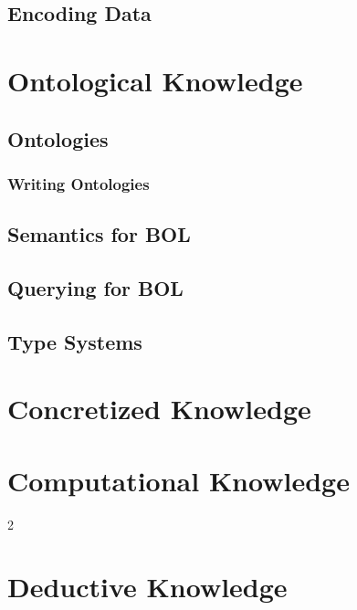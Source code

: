 \documentclass{book}
\begin{document}
\chapter{Encoding Data}\label{sec:wuv:codecs}
  

\part{Ontological Knowledge}\label{sec:wuv:ont}

\chapter{Ontologies}
 
 \section{Writing Ontologies}\label{sec:onto:write}
   

\chapter{Semantics for BOL}\label{sec:bolsem}
 

\chapter{Querying for BOL}\label{sec:bolquery}
 

\chapter{Type Systems}\label{sec:onto:type}
   
 
\part{Concretized Knowledge}\label{sec:wuv:concr}

\part{Computational Knowledge}\label{sec:wuv:comp}2

\part{Deductive Knowledge}\label{sec:wuv:ded}
\end{document}
